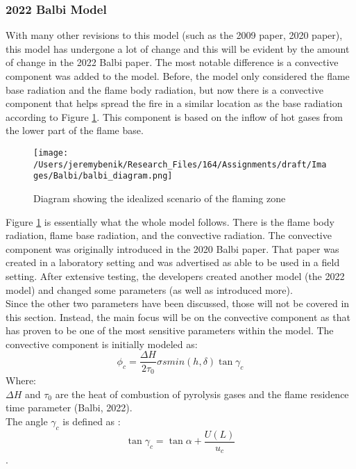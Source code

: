\documentclass{article}
\begin{document}
\subsubsection*{2022 Balbi Model}
\indent With many other revisions to this model (such as the 2009 paper, 2020 paper), this model has undergone a lot of change and this will be evident by the amount of change in the 2022 Balbi paper. The most notable difference is a convective component was added to the model. Before, the model only considered the flame base radiation and the flame body radiation, but now there is a convective component that helps spread the fire in a similar location as the base radiation according to Figure \ref{Balbi_flame_diagram}. This component is based on the inflow of hot gases from the lower part of the flame base. \\
\begin{figure}
  \texttt{[image: /Users/jeremybenik/Research\_Files/164/Assignments/draft/Images/Balbi/balbi\_diagram.png]}
  \caption{Diagram showing the idealized scenario of the flaming zone}
  \label{Balbi_flame_diagram}
\end{figure}
\indent Figure \ref{Balbi_flame_diagram} is essentially what the whole model follows. There is the flame body radiation, flame base radiation, and the convective radiation. The convective component was originally introduced in the 2020 Balbi paper. That paper was created in a laboratory setting and was advertised as able to be used in a field setting. After extensive testing, the developers created another model (the 2022 model) and changed some parameters (as well as introduced more). \\
\indent Since the other two parameters have been discussed, those will not be covered in this section. Instead, the main focus will be on the convective component as that has proven to be one of the most sensitive parameters within the model. The convective component is initially modeled as:
\begin{equation}
	\label{convection intro}
	\phi _ c = \frac {\Delta H} {2 \tau _ 0} \sigma s min(h, \delta) \tan \gamma _ c
\end{equation}
Where: \\
$\Delta H$ and $\tau _ 0$ are the heat of combustion of pyrolysis gases and the flame residence time parameter (Balbi, 2022).\\
\indent The angle $\gamma _ {c}$ is defined as :
\begin{equation}
	\tan \gamma _ {c} = \tan \alpha + \frac {U(L)} {u_{c}}
\end{equation}. 
\end{document}
